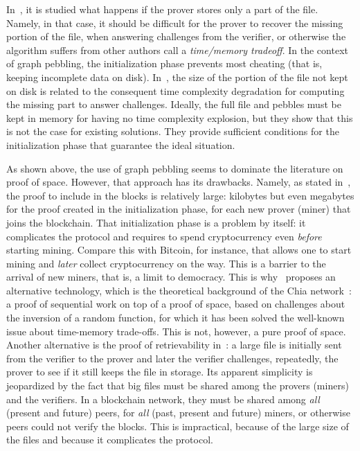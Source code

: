 In~\cite{Reyzin23}, it is studied what happens if the prover stores only a part of the file.
Namely, in that case, it should be difficult for the prover to recover the
missing portion of the file, when answering challenges from the verifier, or otherwise
the algorithm suffers from other authors call a \emph{time/memory tradeoff}.
In the context of graph pebbling, the initialization phase prevents most cheating
(that is, keeping incomplete data on disk). In~\cite{Reyzin23}, the size
of the portion of the file not kept on disk is related to the consequent time
complexity degradation for computing the missing part to answer challenges.
Ideally, the full file and pebbles must be kept in memory
for having no time complexity explosion, but they show that this is not the case for existing solutions.
They provide sufficient conditions for the initialization phase that guarantee the ideal situation.

As shown above, the use of graph pebbling seems to dominate the literature on proof of space.
However, that approach has its drawbacks.
Namely, as stated in~\cite{AbusalahACKPR17}, the proof to include in the blocks is relatively large:
kilobytes but even megabytes for the proof created in the initialization phase, for each new
prover (miner) that joins the blockchain. That initialization phase is a problem by itself: it complicates
the protocol and requires to spend cryptocurrency even \emph{before}
starting mining. Compare this with Bitcoin, for instance, that allows one to start mining
and \emph{later} collect cryptocurrency on the way. This is a barrier to the arrival of new
miners, that is, a limit to democracy.
This is why~\cite{AbusalahACKPR17} proposes an alternative technology, which is the
theoretical background of the Chia network~\cite{Chia}:
a proof of sequential work on top of a proof of space, based on challenges
about the inversion of a random function, for which it has been solved
the well-known issue about time-memory trade-offs. This is not, however, a pure proof of space.
Another alternative is the proof of retrievability in~\cite{JuelsK07}: a large file
is initially sent from the verifier to the prover and later the verifier
challenges, repeatedly, the prover to see if it still keeps the file in storage.
Its apparent simplicity
is jeopardized by the fact that big files must be shared among the provers (miners) and
the verifiers. In a blockchain network, they must be shared among \emph{all} (present and future)
peers, for \emph{all} (past, present and future) miners, or otherwise peers could not verify the blocks.
This is impractical, because of the large size of the files and because it complicates the protocol.

